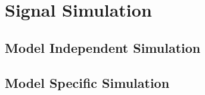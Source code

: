 \setchapterpreamble[u]{\margintoc}

\chapter{Signal Simulation}


\section{Model Independent Simulation}

\section{Model Specific Simulation}
